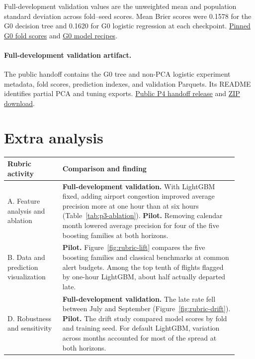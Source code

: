\documentclass{article}
\begin{document}
Full-development validation values are the unweighted mean and population
standard deviation across fold--seed scores. Mean Brier scores were 0.1578
for the G0 decision tree and 0.1620 for G0 logistic regression at each
checkpoint.
\href{https://github.com/oki-dokii/Flight-Departure-Delay-Prediction-/blob/4780bd7c656e486e4710066c89c7601de3d15b7b/reports/p4_phase_b_full/G0/verified_full_fold_runs.csv}{Pinned G0 fold scores}
and
\href{https://github.com/oki-dokii/Flight-Departure-Delay-Prediction-/blob/4780bd7c656e486e4710066c89c7601de3d15b7b/reports/p4_phase_b_full/G0/verified_full_fold_recipes.json}{G0 model recipes}.
\paragraph{Full-development validation artifact.}
The public handoff contains the G0 tree and non-PCA logistic experiment
metadata, fold scores, prediction indexes, and validation Parquets. Its
README identifies partial PCA and tuning exports.
\href{https://github.com/oki-dokii/Flight-Departure-Delay-Prediction-/releases/tag/p4-validation-handoff-2026-11-25}{Public P4 handoff release}
and
\href{https://github.com/oki-dokii/Flight-Departure-Delay-Prediction-/releases/download/p4-validation-handoff-2026-11-25/p4-full-scale-2026-11-25.zip}{ZIP download}.

\section{Extra analysis}
\begin{center}\small
\begin{tabular}{@{}p{0.22\linewidth}p{0.70\linewidth}@{}}\toprule
Rubric activity & Comparison and finding \\ \midrule
A. Feature analysis and ablation & \textbf{Full-development validation.} With LightGBM fixed, adding airport congestion improved average precision more at one hour than at six hours (Table~\ref{tab:p3-ablation}). \textbf{Pilot.} Removing calendar month lowered average precision for four of the five boosting families at both horizons. \\[4pt]
B. Data and prediction visualization & \textbf{Pilot.} Figure~\ref{fig:rubric-lift} compares the five boosting families and classical benchmarks at common alert budgets. Among the top tenth of flights flagged by one-hour LightGBM, about half actually departed late. \\[4pt]
D. Robustness and sensitivity & \textbf{Full-development validation.} The late rate fell between July and September (Figure~\ref{fig:rubric-drift}). \textbf{Pilot.} The drift study compared model scores by fold and training seed. For default LightGBM, variation across months accounted for most of the spread at both horizons. \\
\bottomrule\end{tabular}
\end{center}
\end{document}
